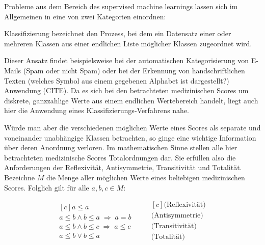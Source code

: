 Probleme aus dem Bereich des supervised machine learnings lassen sich im Allgemeinen in eine von zwei Kategorien einordnen:

Klassifizierung bezeichnet den Prozess, bei dem ein Datensatz einer oder mehreren Klassen aus einer endlichen Liste möglicher Klassen zugeordnet wird. 

Dieser Ansatz findet beispielsweise bei der automatischen Kategorisierung von E-Mails (Spam oder nicht Spam) oder bei der Erkennung von handschriftlichen Texten (welches Symbol aus einem gegebenen Alphabet ist dargestellt?) Anwendung (CITE). Da es sich bei den betrachteten medizinischen Scores um diskrete, ganzzahlige Werte aus einem endlichen Wertebereich handelt, liegt auch hier die Anwendung eines Klassifizierungs-Verfahrens nahe.

Würde man aber die verschiedenen möglichen Werte eines Scores als separate und voneinander unabhängige Klassen betrachten, so ginge eine wichtige Information über deren Anordnung verloren. Im mathematischen Sinne stellen alle hier betrachteten medizinische Scores Totalordnungen dar. Sie erfüllen also die Anforderungen der Reflexivität, Antisymmetrie, Transitivität und Totalität. Bezeichne $M$ die Menge aller möglichen Werte eines beliebigen medizinischen Scores. Folglich gilt für alle $a,b,c \in M$:

\begin{equation*}
    \begin{aligned}[c]
        a \leq a\\
        a \leq b \land b \leq a \; \Rightarrow \; a=b\\
        a \leq b \land b \leq c \; \Rightarrow \; a \leq c\\
        a \leq b \lor b \leq a
    \end{aligned}
    \qquad
    \begin{aligned}[c]
        \text{(Reflexivität)}\\
        \text{(Antisymmetrie)}\\
        \text{(Transitivität)}\\
        \text{(Totalität)}
    \end{aligned}
\end{equation*}



